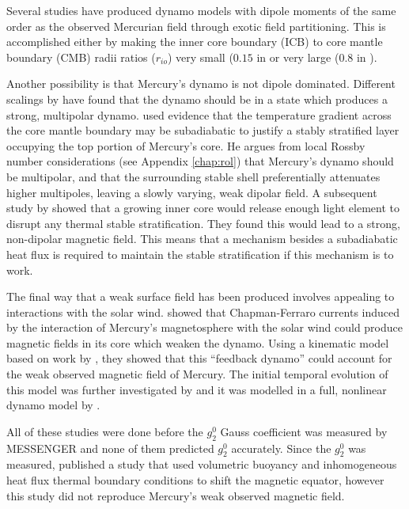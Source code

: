 Several studies \citep{stanleyandbloxham2005,heimpelandaurnou2005,christensen06,takahashi06} have produced dynamo models with dipole moments of the same order as the observed Mercurian field through exotic field partitioning. This is accomplished either by making the inner core boundary (ICB) to core mantle boundary (CMB) radii ratios ($r_{io}$) very small ($0.15$ in \citet{heimpelandaurnou2005} or very large ($0.8$ in \citet{stanleyandbloxham2005}).

Another possibility is that Mercury's dynamo is not dipole dominated. Different scalings by \citet{OlsonandChristensen2006} have found that the dynamo should be in a state which produces a strong, multipolar dynamo. \citet{christensen06} used evidence that the temperature gradient across the core mantle boundary may be subadiabatic to justify a stably stratified layer occupying the top portion of Mercury's core. He argues from local Rossby number considerations (see Appendix \ref{chap:rol}) that Mercury's dynamo should be multipolar, and that the surrounding stable shell preferentially attenuates higher multipoles, leaving a slowly varying, weak dipolar field. A subsequent study by \citet{manglik2010} showed that a growing inner core would release enough light element to disrupt any thermal stable stratification. They found this would lead to a strong, non-dipolar magnetic field. This means that a mechanism besides a subadiabatic heat flux is required to maintain the stable stratification if this mechanism is to work.

The final way that a weak surface field has been produced involves appealing to interactions with the solar wind. \citet{glassmaier2007} showed that Chapman-Ferraro currents induced by the interaction of Mercury's magnetosphere with the solar wind could produce magnetic fields in its core which  weaken the dynamo. Using a kinematic model based on work by \citet{levy1979}, they showed that this ``feedback dynamo'' could account for the weak observed magnetic field of Mercury. The initial temporal evolution of this model was further investigated by \citet{heyner2010} and it was modelled in a full, nonlinear dynamo model by \citet{heyner2011}.

All of these studies were done before the $g_2^0$ Gauss coefficient was measured by MESSENGER and none of them predicted $g_2^0$ accurately. Since the $g_2^0$ was measured, \citet{cao2014} published a study that used volumetric buoyancy and inhomogeneous heat flux thermal boundary conditions to shift the magnetic equator, however this study did not reproduce Mercury's weak observed magnetic field.

